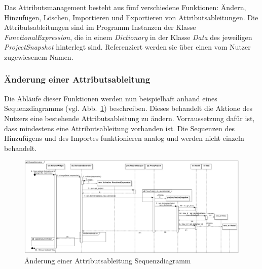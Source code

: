\documentclass{article}
\begin{document}
Das Attributsmanagement besteht aus fünf verschiedene Funktionen: Ändern, Hinzufügen, Löschen, Importieren und Exportieren von Attributsableitungen. Die Attributsableitungen sind im Programm Instanzen der Klasse \textit{FunctionalExpression}, die in einem \textit{Dictionary} in der Klasse \textit{Data} des jeweiligen \textit{ProjectSnapshot} hinterlegt sind. Referenziert werden sie über einen vom Nutzer zugewiesenem Namen.

\subsubsection{Änderung einer Attributsableitung}
Die Abläufe dieser Funktionen werden nun beispielhaft anhand eines Sequenzdiagramms (vgl. Abb.~\ref{fig:sq:ChangeDerivativeSequenceDiagram}) beschreiben. Dieses behandelt die Aktione des Nutzers eine bestehende Attributsableitung zu ändern. Vorraussetzung dafür ist, dass mindestens eine Attributsableitung vorhanden ist. Die Sequenzen des Hinzufügens und des Importes funktionieren analog und werden nicht einzeln behandelt.

\begin{figure}[H]%
    \centering
    \includegraphics[width=12cm]{entwurf/Floriane/ChangeDerivative.png}
    \caption{Änderung einer Attributsableitung Sequenzdiagramm}
    \label{fig:sq:ChangeDerivativeSequenceDiagram}
\end{figure}
\end{document}
